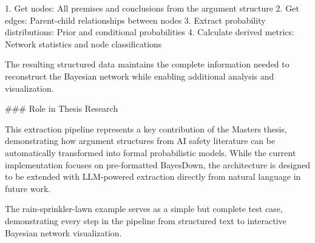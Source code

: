 \documentclass[
  11pt,
  letterpaper,
]{book}
\newenvironment{Shaded}{\begin{snugshade}}{\end{snugshade}}
\newcommand{\ErrorTok}[1]{\textcolor[rgb]{0.68,0.00,0.00}{#1}}
\begin{document}
\begin{Shaded}
\begin{Highlighting}[]
\ErrorTok{1.} \ErrorTok{Get} \ErrorTok{nodes:} \ErrorTok{All} \ErrorTok{premises} \ErrorTok{and} \ErrorTok{conclusions} \ErrorTok{from} \ErrorTok{the} \ErrorTok{argument} \ErrorTok{structure}
\ErrorTok{2.} \ErrorTok{Get} \ErrorTok{edges:} \ErrorTok{Parent{-}child} \ErrorTok{relationships} \ErrorTok{between} \ErrorTok{nodes}
\ErrorTok{3.} \ErrorTok{Extract} \ErrorTok{probability} \ErrorTok{distributions:} \ErrorTok{Prior} \ErrorTok{and} \ErrorTok{conditional} \ErrorTok{probabilities}
\ErrorTok{4.} \ErrorTok{Calculate} \ErrorTok{derived} \ErrorTok{metrics:} \ErrorTok{Network} \ErrorTok{statistics} \ErrorTok{and} \ErrorTok{node} \ErrorTok{classifications}

\ErrorTok{The} \ErrorTok{resulting} \ErrorTok{structured} \ErrorTok{data} \ErrorTok{maintains} \ErrorTok{the} \ErrorTok{complete} \ErrorTok{information} \ErrorTok{needed} \ErrorTok{to} \ErrorTok{reconstruct} \ErrorTok{the} \ErrorTok{Bayesian} \ErrorTok{network} \ErrorTok{while} \ErrorTok{enabling} \ErrorTok{additional} \ErrorTok{analysis} \ErrorTok{and} \ErrorTok{visualization.}

\ErrorTok{\#\#\#} \ErrorTok{Role} \ErrorTok{in} \ErrorTok{Thesis} \ErrorTok{Research}

\ErrorTok{This} \ErrorTok{extraction} \ErrorTok{pipeline} \ErrorTok{represents} \ErrorTok{a} \ErrorTok{key} \ErrorTok{contribution} \ErrorTok{of} \ErrorTok{the} \ErrorTok{Master\textquotesingle{}s} \ErrorTok{thesis,} \ErrorTok{demonstrating} \ErrorTok{how} \ErrorTok{argument} \ErrorTok{structures} \ErrorTok{from} \ErrorTok{AI} \ErrorTok{safety} \ErrorTok{literature} \ErrorTok{can} \ErrorTok{be} \ErrorTok{automatically} \ErrorTok{transformed} \ErrorTok{into} \ErrorTok{formal} \ErrorTok{probabilistic} \ErrorTok{models.} \ErrorTok{While} \ErrorTok{the} \ErrorTok{current} \ErrorTok{implementation} \ErrorTok{focuses} \ErrorTok{on} \ErrorTok{pre{-}formatted} \ErrorTok{BayesDown,} \ErrorTok{the} \ErrorTok{architecture} \ErrorTok{is} \ErrorTok{designed} \ErrorTok{to} \ErrorTok{be} \ErrorTok{extended} \ErrorTok{with} \ErrorTok{LLM{-}powered} \ErrorTok{extraction} \ErrorTok{directly} \ErrorTok{from} \ErrorTok{natural} \ErrorTok{language} \ErrorTok{in} \ErrorTok{future} \ErrorTok{work.}

\ErrorTok{The} \ErrorTok{rain{-}sprinkler{-}lawn} \ErrorTok{example} \ErrorTok{serves} \ErrorTok{as} \ErrorTok{a} \ErrorTok{simple} \ErrorTok{but} \ErrorTok{complete} \ErrorTok{test} \ErrorTok{case,} \ErrorTok{demonstrating} \ErrorTok{every} \ErrorTok{step} \ErrorTok{in} \ErrorTok{the} \ErrorTok{pipeline} \ErrorTok{from} \ErrorTok{structured} \ErrorTok{text} \ErrorTok{to} \ErrorTok{interactive} \ErrorTok{Bayesian} \ErrorTok{network} \ErrorTok{visualization.}


\end{Highlighting}
\end{Shaded}
\end{document}
